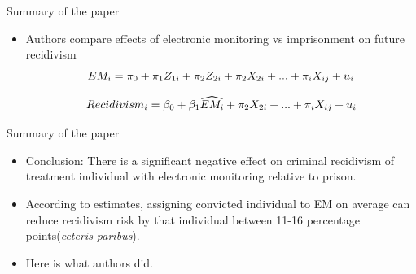 \documentclass{beamer}
\begin{document}
\begin{frame}{Summary of the paper}
\begin{itemize}
        \item Authors compare effects of electronic monitoring vs imprisonment on future recidivism
         \begin{equation}
    \centering
    EM_i = \pi_0 + \pi_1Z_{1i} + \pi_2Z_{2i} + \pi_2X_{2i} + ... + \pi_iX_{ij} + u_i  
    \end{equation}
    
        
         \begin{equation}
    \centering
    Recidivism_i = \beta_0 + \beta_1\widehat{EM_i} + \pi_2X_{2i} + ... + \pi_iX_{ij} + u_i  
\end{equation}
        
    \end{itemize}
\end{frame}
\begin{frame}{Summary of the paper}
\begin{itemize}
        \item Conclusion: There is a significant negative effect on criminal recidivism of treatment individual with electronic monitoring relative to prison. 
        \item According to estimates, assigning convicted individual to EM on average can reduce recidivism risk by that individual between 11-16 percentage points(\textit{ceteris paribus}).
        \item  Here is what authors did.
    \end{itemize}
\end{frame}


\end{document}
